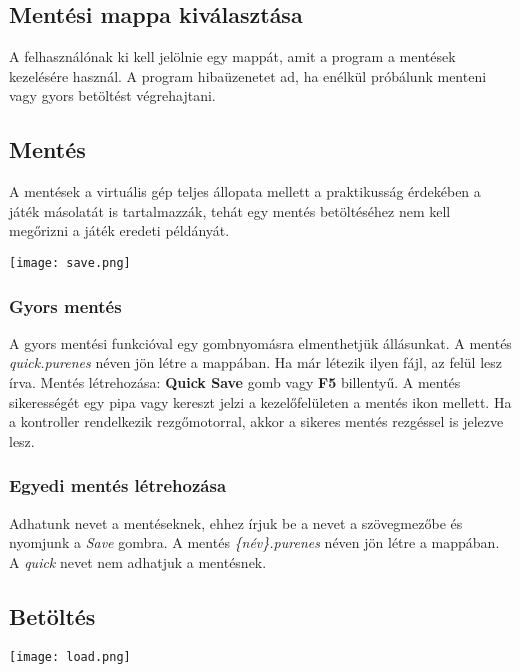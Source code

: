 \subsection{Mentési mappa kiválasztása}

A felhasználónak ki kell jelölnie egy mappát, amit a program a mentések kezelésére használ. A program hibaüzenetet ad, ha enélkül próbálunk menteni vagy gyors betöltést végrehajtani.

\subsection{Mentés}

A mentések a virtuális gép teljes állopata mellett a praktikusság érdekében a játék másolatát is tartalmazzák, tehát egy mentés betöltéséhez nem kell megőrizni a játék eredeti példányát.

\begin{center}
	\texttt{[image: save.png]}
\end{center}

\subsubsection{Gyors mentés}

A gyors mentési funkcióval egy gombnyomásra elmenthetjük állásunkat. A mentés \emph{quick.purenes} néven jön létre a mappában. Ha már létezik ilyen fájl, az felül lesz írva.
Mentés létrehozása: \textbf{Quick Save} gomb vagy \textbf{F5} billentyű.
A mentés sikerességét egy pipa vagy kereszt jelzi a kezelőfelületen a mentés ikon mellett.
Ha a kontroller rendelkezik rezgőmotorral, akkor a sikeres mentés rezgéssel is jelezve lesz.

\subsubsection{Egyedi mentés létrehozása}

Adhatunk nevet a mentéseknek, ehhez írjuk be a nevet a szövegmezőbe és nyomjunk a \emph{Save} gombra. A mentés \emph{\{név\}.purenes} néven jön létre a mappában. A \emph{quick} nevet nem adhatjuk a mentésnek.

\subsection{Betöltés}

\begin{center}
	\texttt{[image: load.png]}
\end{center}

